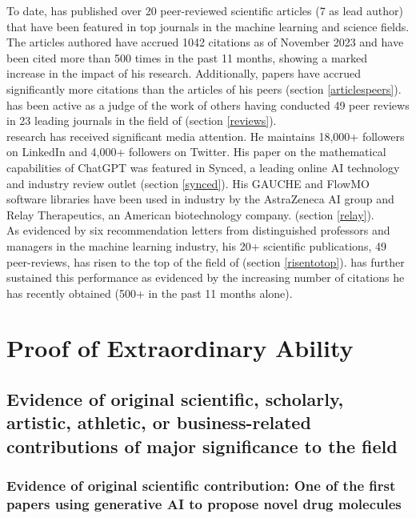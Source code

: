 \documentclass[11pt]{article}
\begin{document}
To date, \dr has published over 20 peer-reviewed scientific articles (7 as lead author) that have been featured in top journals in the machine learning and science fields. The articles \dr authored have accrued 1042 citations as of November 2023 and have been cited more than 500 times in the past 11 months, showing a marked increase in the impact of his research. Additionally, \drs papers have accrued significantly more citations than the articles of his peers (section \ref{articlespeers}). \\


\dr has been active as a judge of the work of others having conducted 49 peer reviews in 23 leading journals in the field of \fie{} (section \ref{reviews}). \\


\drs research has received significant media attention. He maintains 18,000+ followers on LinkedIn and 4,000+ followers on Twitter. His paper on the mathematical capabilities of ChatGPT was featured in Synced, a leading online AI technology and industry review outlet (section \ref{synced}). His GAUCHE and FlowMO software libraries have been used in industry by the AstraZeneca AI group and Relay Therapeutics, an American biotechnology company. (section \ref{relay}). \\


As evidenced by six recommendation letters from distinguished professors and managers in the machine learning industry, his 20+ scientific publications, 49 peer-reviews, \dr has risen to the top of the field of \fie{} (section \ref{risentotop}). \dr has further sustained this performance as evidenced by the increasing number of citations he has recently obtained (500+ in the past 11 months alone).


\section{Proof of \drs Extraordinary Ability}

\subsection{Evidence of original scientific, scholarly, artistic, athletic, or business-related contributions of major significance to the field}
\label{original}

\subsubsection{Evidence of original scientific contribution: One of the first papers using generative AI to propose novel drug molecules}
\label{conbo}
\end{document}
